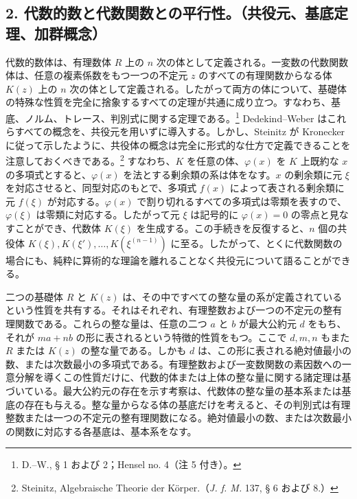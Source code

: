 \documentclass[11pt]{article}
\begin{document}
\subsection*{2. 代数的数と代数関数との平行性。（共役元、基底定理、加群概念）}
代数的数体は、有理数体 \(R\) 上の \(n\) 次の体として定義される。一変数の代数関数体は、任意の複素係数をもつ一つの不定元 \(z\) のすべての有理関数からなる体 \(K(z)\) 上の \(n\) 次の体として定義される。したがって両方の体について、基礎体の特殊な性質を完全に捨象するすべての定理が共通に成り立つ。すなわち、基底、ノルム、トレース、判別式に関する定理である。\footnote{D.--W., § 1 および 2；Hensel no. 4（注 5 付き）。} Dedekind--Weber はこれらすべての概念を、共役元を用いずに導入する。しかし、Steinitz が Kronecker に従って示したように、共役体の概念は完全に形式的な仕方で定義できることを注意しておくべきである。\footnote{Steinitz, Algebraische Theorie der Körper.（\emph{J. f. M.} 137, § 6 および 8.）} すなわち、\(K\) を任意の体、\(\varphi(x)\) を \(K\) 上既約な \(x\) の多項式とすると、\(\varphi(x)\) を法とする剰余類の系は体をなす。\(x\) の剰余類に元 \(\xi\) を対応させると、同型対応のもとで、多項式 \(f(x)\) によって表される剰余類に元 \(f(\xi)\) が対応する。\(\varphi(x)\) で割り切れるすべての多項式は零類を表すので、\(\varphi(\xi)\) は零類に対応する。したがって元 \(\xi\) は記号的に \(\varphi(x)=0\) の零点と見なすことができ、代数体 \(K(\xi)\) を生成する。この手続きを反復すると、\(n\) 個の共役体 \(K(\xi),K(\xi'),\ldots,K(\xi^{(n-1)})\) に至る。したがって、とくに代数関数の場合にも、純粋に算術的な理論を離れることなく共役元について語ることができる。

二つの基礎体 \(R\) と \(K(z)\) は、その中ですべての整な量の系が定義されているという性質を共有する。それはそれぞれ、有理整数および一つの不定元の整有理関数である。これらの整な量は、任意の二つ \(a\) と \(b\) が最大公約元 \(d\) をもち、それが \(ma+nb\) の形に表されるという特徴的性質をもつ。ここで \(d,m,n\) もまた \(R\) または \(K(z)\) の整な量である。しかも \(d\) は、この形に表される絶対値最小の数、または次数最小の多項式である。有理整数および一変数関数の素因数への一意分解を導くこの性質だけに、代数的体または上体の整な量に関する諸定理は基づいている。最大公約元の存在を示す考察は、代数体の整な量の基本系または基底の存在も与える。整な量からなる体の基底だけを考えると、その判別式は有理整数または一つの不定元の整有理関数になる。絶対値最小の数、または次数最小の関数に対応する各基底は、基本系をなす。
\end{document}
